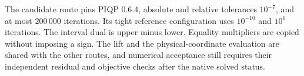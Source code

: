 The candidate route pins PIQP 0.6.4, absolute and relative tolerances
\(10^{-7}\), and at most \(200\,000\) iterations. Its tight reference
configuration uses \(10^{-10}\) and \(10^6\) iterations.
The interval dual is upper minus lower. Equality multipliers are
copied without imposing a sign. The lift and the physical-coordinate
evaluation are shared with the other routes, and numerical
acceptance still requires their independent residual and objective
checks after the native solved status.
